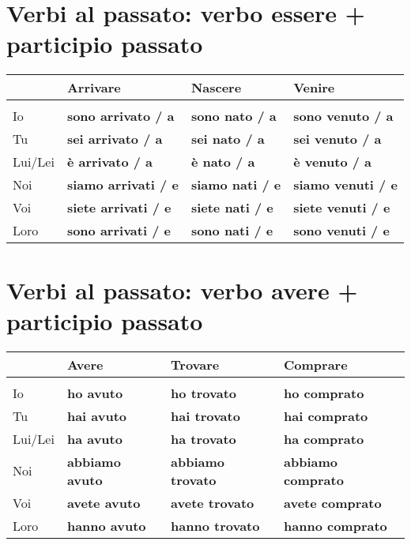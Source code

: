 \documentclass[letter,11pt]{article}
\begin{document}
\vskip 0.2in
\section*{Verbi al passato: verbo essere + participio passato}
\vskip 0.2in

\begin{tabular}{ |p{2cm}| p{3.5cm}| p{3.5cm}| p{3.5cm}| }
      & Arrivare & Nascere & Venire  \\
    \hline
    \hline
     &  &  &  \\ \hline
    Io      & {\bf sono arrivato / a} & {\bf sono nato / a} & {\bf sono venuto / a}  \\ \hline
    Tu      & {\bf sei arrivato / a} & {\bf sei nato / a} & {\bf sei venuto / a}   \\ \hline
    Lui/Lei & {\bf è arrivato / a} & {\bf è nato / a} & {\bf è venuto / a}    \\ \hline
    Noi     & {\bf siamo arrivati / e} & {\bf siamo nati / e} & {\bf siamo venuti / e} \\ \hline
    Voi     & {\bf siete arrivati / e} & {\bf siete nati / e} & {\bf siete venuti / e} \\ \hline
    Loro    & {\bf sono arrivati / e} & {\bf sono nati / e} & {\bf sono venuti / e}\\ \hline
    \hline
\end{tabular}

\vskip 0.2in
\section*{Verbi al passato: verbo avere + participio passato}
\vskip 0.2in

\begin{tabular}{ |p{2cm}| p{3.5cm}| p{3.5cm}| p{4 cm}| }
      & Avere & Trovare & Comprare  \\
    \hline
    \hline
     &  &  & \\ \hline
    Io      & {\bf ho avuto}      & {\bf ho trovato}     &  {\bf ho comprato} \\ \hline
    Tu      & {\bf hai avuto}     & {\bf hai trovato}  &  {\bf hai comprato}  \\ \hline
    Lui/Lei & {\bf ha avuto}      & {\bf ha trovato}   &  {\bf ha comprato}\\ \hline
    Noi     & {\bf abbiamo avuto} & {\bf abbiamo trovato} & {\bf abbiamo comprato} \\ \hline
    Voi     & {\bf avete avuto}   & {\bf avete trovato}   &  {\bf avete comprato}  \\ \hline
    Loro    & {\bf hanno avuto}   & {\bf hanno trovato}   &  {\bf hanno comprato}  \\ \hline
    \hline
\end{tabular}
\end{document}
